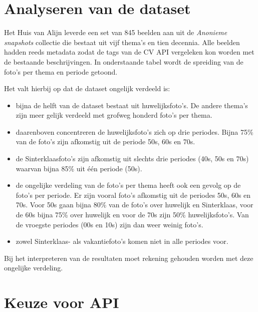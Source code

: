 \section{Analyseren van de dataset}
\label{sec:analyseren-van-de-dataset}

Het Huis van Alijn leverde een set van 845 beelden aan uit de \textit{Anonieme snapshots} collectie die bestaat uit vijf thema’s en tien decennia. Alle beelden hadden reeds metadata zodat de tags van de CV API vergeleken kon worden met de bestaande beschrijvingen. In onderstaande tabel wordt de spreiding van de foto’s per thema en periode getoond.


Het valt hierbij op dat de dataset ongelijk verdeeld is:
\begin{itemize}
	\item bijna de helft van de dataset bestaat uit huwelijksfoto’s. De andere thema’s zijn meer gelijk verdeeld met grofweg honderd foto’s per thema. 
	\item daarenboven concentreren de huwelijksfoto’s zich op drie periodes. Bijna 75\% van de foto’s zijn afkomstig uit de periode 50s, 60s en 70s. 
	\item de Sinterklaasfoto’s zijn afkomstig uit slechts drie periodes (40s, 50s en 70s) waarvan bijna 85\% uit één periode (50s).
	\item de ongelijke verdeling van de foto’s per thema heeft ook een gevolg op de foto’s per periode. Er zijn vooral foto’s afkomstig uit de periodes 50s, 60s en 70s. Voor 50s gaan bijna 80\% van de foto’s over huwelijk en Sinterklaas, voor de 60s bijna 75\% over huwelijk en voor de 70s zijn 50\% huwelijksfoto’s. Van de vroegste periodes (00s en 10s) zijn dan weer weinig foto’s. 
	\item zowel Sinterklaas- als vakantiefoto’s komen niet in alle periodes voor.
\end{itemize}

Bij het interpreteren van de resultaten moet rekening gehouden worden met deze ongelijke verdeling.

\section{Keuze voor API}
\label{sec:keuze-voor-api}

